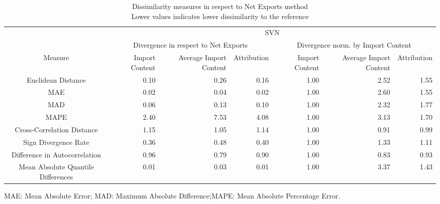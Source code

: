 \begin{table}[t]
\caption*{
{\large Dissimilarity measures in respect to Net Exports method} \\ 
{\small Lower values indicates lower dissimilarity to the reference}
} 
\fontsize{15.0pt}{18.0pt}\selectfont
\begin{tabular*}{\linewidth}{@{\extracolsep{\fill}}crrrrrr}
\toprule
 & \multicolumn{6}{c}{SVN} \\ 
\cmidrule(lr){2-7}
 & \multicolumn{3}{c}{Divergence in respect to Net Exports} & \multicolumn{3}{c}{Divergence norm. by Import Content} \\ 
\cmidrule(lr){2-4} \cmidrule(lr){5-7}
Measure & Import Content & Average Import Content & Attribution & Import Content & Average Import Content & Attribution \\ 
\midrule\addlinespace[2.5pt]
Euclidean Distance & 0.10 & 0.26 & 0.16 & 1.00 & 2.52 & 1.55 \\ 
MAE & 0.02 & 0.04 & 0.02 & 1.00 & 2.60 & 1.55 \\ 
MAD & 0.06 & 0.13 & 0.10 & 1.00 & 2.32 & 1.77 \\ 
MAPE & 2.40 & 7.53 & 4.08 & 1.00 & 3.13 & 1.70 \\ 
Cross-Correlation Distance & 1.15 & 1.05 & 1.14 & 1.00 & 0.91 & 0.99 \\ 
Sign Divergence Rate & 0.36 & 0.48 & 0.40 & 1.00 & 1.33 & 1.11 \\ 
Difference in Autocorrelation & 0.96 & 0.79 & 0.90 & 1.00 & 0.83 & 0.93 \\ 
Mean Absolute Quantile Differences & 0.01 & 0.03 & 0.01 & 1.00 & 3.37 & 1.43 \\ 
\bottomrule
\end{tabular*}
\begin{minipage}{\linewidth}
MAE: Mean Absolute Error; MAD: Maximum Absolute Difference;MAPE: Mean Absolute Percentage Error.\\
\end{minipage}
\end{table}

